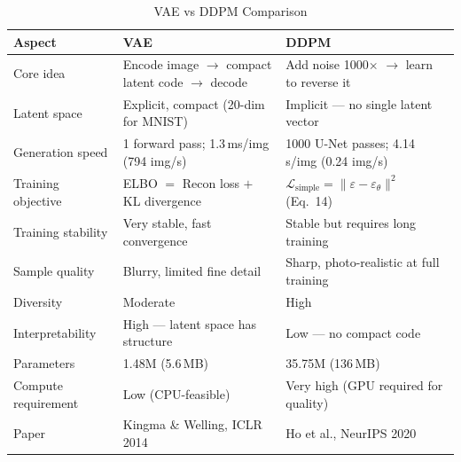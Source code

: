 \documentclass{article}
\begin{document}
\begin{table}[H]
\centering
\caption{VAE vs DDPM Comparison}
\begin{tabular}{p{3.5cm} p{5cm} p{5cm}}
\toprule
\textbf{Aspect} & \textbf{VAE} & \textbf{DDPM} \\
\midrule
Core idea           & Encode image $\to$ compact latent code $\to$ decode
                    & Add noise 1000$\times$ $\to$ learn to reverse it \\[4pt]
Latent space        & Explicit, compact (20-dim for MNIST)
                    & Implicit --- no single latent vector \\[4pt]
Generation speed    & 1 forward pass; 1.3\,ms/img (794 img/s)
                    & 1000 U-Net passes; 4.14\,s/img (0.24 img/s) \\[4pt]
Training objective  & ELBO $=$ Recon loss $+$ KL divergence
                    & $\mathcal{L}_{\text{simple}} = \|\varepsilon - \varepsilon_\theta\|^2$ (Eq.\ 14) \\[4pt]
Training stability  & Very stable, fast convergence
                    & Stable but requires long training \\[4pt]
Sample quality      & Blurry, limited fine detail
                    & Sharp, photo-realistic at full training \\[4pt]
Diversity           & Moderate                & High \\[4pt]
Interpretability    & High --- latent space has structure
                    & Low --- no compact code \\[4pt]
Parameters          & 1.48M (5.6\,MB)         & 35.75M (136\,MB) \\[4pt]
Compute requirement & Low (CPU-feasible)      & Very high (GPU required for quality) \\[4pt]
Paper               & Kingma \& Welling, ICLR 2014
                    & Ho et al., NeurIPS 2020 \\
\bottomrule
\end{tabular}
\end{table}
\end{document}

